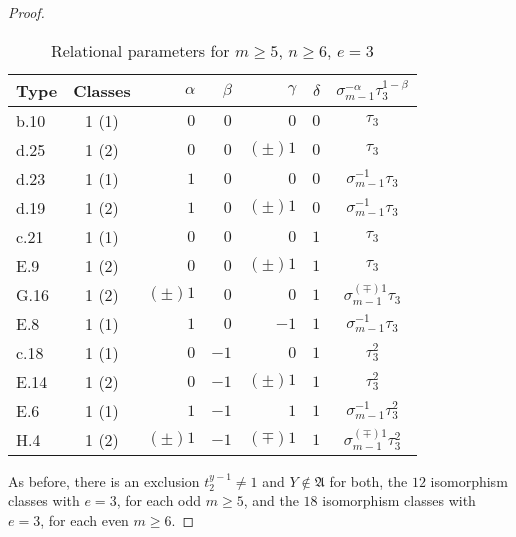 \documentclass{amsart}
\theoremstyle{definition}
\numberwithin{equation}{section}
\begin{document}
\begin{proof}
\smallskip
\begin{table}[h]
\caption{Relational parameters for \(m\ge 5\), \(n\ge 6\), \(e=3\)}
\label{tbl:SecExp}
\begin{center}
\begin{tabular}{|l|c|rrrr|c|}
\hline
 Type &   Classes & \(\alpha\) & \(\beta\) & \(\gamma\) & \(\delta\) & \(\sigma_{m-1}^{-\alpha}\tau_3^{1-\beta}\) \\
\hline
 b.10 &     1 (1) &      \(0\) &     \(0\) &      \(0\) &      \(0\) &                                 \(\tau_3\) \\
 d.25 &     1 (2) &      \(0\) &     \(0\) & \((\pm)1\) &      \(0\) &                                 \(\tau_3\) \\
 d.23 &     1 (1) &      \(1\) &     \(0\) &      \(0\) &      \(0\) &                \(\sigma_{m-1}^{-1}\tau_3\) \\
 d.19 &     1 (2) &      \(1\) &     \(0\) & \((\pm)1\) &      \(0\) &                \(\sigma_{m-1}^{-1}\tau_3\) \\
\hline
 c.21 &     1 (1) &      \(0\) &     \(0\) &      \(0\) &      \(1\) &                                 \(\tau_3\) \\
 E.9  &     1 (2) &      \(0\) &     \(0\) & \((\pm)1\) &      \(1\) &                                 \(\tau_3\) \\
 G.16 &     1 (2) & \((\pm)1\) &     \(0\) &      \(0\) &      \(1\) &            \(\sigma_{m-1}^{(\mp)1}\tau_3\) \\
 E.8  &     1 (1) &      \(1\) &     \(0\) &     \(-1\) &      \(1\) &                \(\sigma_{m-1}^{-1}\tau_3\) \\
\hline
 c.18 &     1 (1) &      \(0\) &    \(-1\) &      \(0\) &      \(1\) &                               \(\tau_3^2\) \\
 E.14 &     1 (2) &      \(0\) &    \(-1\) & \((\pm)1\) &      \(1\) &                               \(\tau_3^2\) \\
 E.6  &     1 (1) &      \(1\) &    \(-1\) &      \(1\) &      \(1\) &              \(\sigma_{m-1}^{-1}\tau_3^2\) \\
 H.4  &     1 (2) & \((\pm)1\) &    \(-1\) & \((\mp)1\) &      \(1\) &          \(\sigma_{m-1}^{(\mp)1}\tau_3^2\) \\
\hline
\end{tabular}
\end{center}
\end{table}

\noindent
As before, there is an exclusion \(t_2^{y-1}\ne 1\) and \(Y\notin\mathfrak{A}\) for both,
the \(12\) isomorphism classes with \(e=3\), for each odd \(m\ge 5\),
and the \(18\) isomorphism classes with \(e=3\), for each even \(m\ge 6\).
\end{proof}
\end{document}
